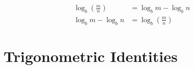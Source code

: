 \documentclass[20150903-160354-rs2.2-MarksMathNotebook.tex]{subfiles}
\begin{document}
\begin{arule}
\begin{subequations}
\begin{align}
	\log_b \left( \frac{m}{n} \right) &= \log_b m - \log_b n \label{eq:lqcbpo1}\\
	 \log_b m - \log_b n &= \log_b \left( \frac{m}{n} \right) \label{eq:lqcbpo2}
\end{align}
\end{subequations}
\end{arule}


\section{Trigonometric Identities}
\end{document}
